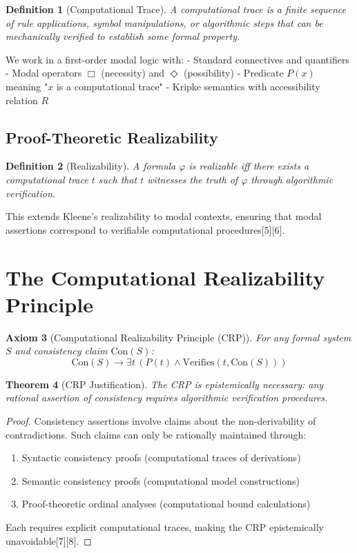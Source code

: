 \documentclass[12pt]{article}
\newtheorem{theorem}{Theorem}
\newtheorem{definition}[theorem]{Definition}
\newtheorem{axiom}[theorem]{Axiom}
\begin{document}
\begin{definition}[Computational Trace]
A \emph{computational trace} is a finite sequence of rule applications, symbol manipulations, or algorithmic steps that can be mechanically verified to establish some formal property.
\end{definition}

We work in a first-order modal logic with:
- Standard connectives and quantifiers
- Modal operators $\Box$ (necessity) and $\Diamond$ (possibility)  
- Predicate $P(x)$ meaning "$x$ is a computational trace"
- Kripke semantics with accessibility relation $R$

\subsection{Proof-Theoretic Realizability}

\begin{definition}[Realizability]
A formula $\varphi$ is \emph{realizable} iff there exists a computational trace $t$ such that $t$ witnesses the truth of $\varphi$ through algorithmic verification.
\end{definition}

This extends Kleene's realizability to modal contexts, ensuring that modal assertions correspond to verifiable computational procedures[5][6].

\section{The Computational Realizability Principle}

\begin{axiom}[Computational Realizability Principle (CRP)]
\label{axiom:crp}
For any formal system $S$ and consistency claim $\text{Con}(S)$:
$$
\text{Con}(S) \rightarrow \exists t\,(P(t) \wedge \text{Verifies}(t, \text{Con}(S)))
$$
\end{axiom}

\begin{theorem}[CRP Justification]
The CRP is epistemically necessary: any rational assertion of consistency requires algorithmic verification procedures.
\end{theorem}

\begin{proof}
Consistency assertions involve claims about the non-derivability of contradictions. Such claims can only be rationally maintained through:
\begin{enumerate}
\item Syntactic consistency proofs (computational traces of derivations)
\item Semantic consistency proofs (computational model constructions)  
\item Proof-theoretic ordinal analyses (computational bound calculations)
\end{enumerate}
Each requires explicit computational traces, making the CRP epistemically unavoidable[7][8].
\end{proof}
\end{document}
